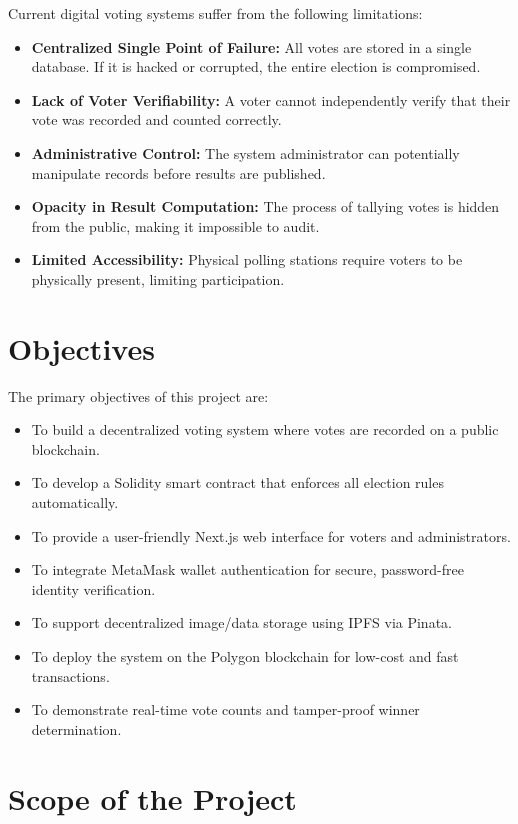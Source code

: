 \documentclass[12pt,a4paper]{report}
\begin{document}
Current digital voting systems suffer from the following limitations:

\begin{itemize}
\item \textbf{Centralized Single Point of Failure:} All votes are stored in a
      single database. If it is hacked or corrupted, the entire election is compromised.
\item \textbf{Lack of Voter Verifiability:} A voter cannot independently verify
      that their vote was recorded and counted correctly.
\item \textbf{Administrative Control:} The system administrator can potentially
      manipulate records before results are published.
\item \textbf{Opacity in Result Computation:} The process of tallying votes is
      hidden from the public, making it impossible to audit.
\item \textbf{Limited Accessibility:} Physical polling stations require voters
      to be physically present, limiting participation.
\end{itemize}

\section{Objectives}

The primary objectives of this project are:

\begin{itemize}
\item To build a decentralized voting system where votes are recorded on a public blockchain.
\item To develop a Solidity smart contract that enforces all election rules automatically.
\item To provide a user-friendly Next.js web interface for voters and administrators.
\item To integrate MetaMask wallet authentication for secure, password-free identity verification.
\item To support decentralized image/data storage using IPFS via Pinata.
\item To deploy the system on the Polygon blockchain for low-cost and fast transactions.
\item To demonstrate real-time vote counts and tamper-proof winner determination.
\end{itemize}

\section{Scope of the Project}
\end{document}
